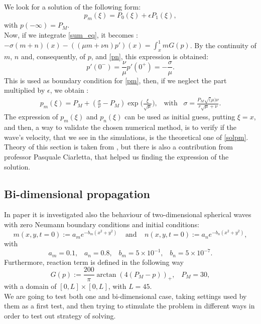 We look for a solution of the following form: 
\begin{equation}
\label{pm}
p_m(\xi) = P_0(\xi) + \epsilon  P_1 (\xi),
\end{equation}
with $ p(-\infty) = P_M $.\\
Now, if we integrate \eqref{sum_eq}, it becomes : $ -\sigma (m + n) (x) - ((\mu m + \nu n) p')(x) = \int^{1}_{x} mG(p)$. By the continuity of $ m $, $ n $ and, consequently, of $ p $, and \eqref{pn}, this expression is obtained:
\begin{equation*}
p'(0^-) = \frac{\nu}{\mu} p'(0^+)=-\frac{\sigma}{\mu}.
\end{equation*} 
This is used as boundary condition for \eqref{pm}, then, if we neglect the part multiplied by $ \epsilon $, we obtain :
\begin{eqnarray}
\label{solpm}
p_m(\xi) = P_M + (\frac{\sigma}{\nu} - P_M) \exp \Big({\frac{\xi}{\sqrt{\mu}}}\Big), \; \; \; \text{with} \; \; \;
\sigma = \frac{P_M \sqrt(\mu) \nu}{r\sqrt{\mu} + \nu}.
\end{eqnarray}
The expression of $ p_m(\xi) $ and $ p_n(\xi) $ can be used as initial guess, putting $ \xi = x $, and then, a way to validate the chosen numerical method, is to verify if the wave's velocity, that we see in the simulations, is the theoretical one of \eqref{solpm}.
Theory of this section is taken from \cite{tumor_growth}, but there is also a contribution from professor Pasquale Ciarletta, that helped us finding the expression of the solution.\\
\subsection{Bi-dimensional propagation}
In paper \cite{tumor_growth} it is investigated also the behaviour of two-dimensional spherical waves with zero Neumann boundary conditions and initial conditions:
\begin{equation*}
m(x,y,t=0) := a_m e^{-b_m (x^2 + y^2)} \; \; \; \; \text{and}\; \; \; \; n(x,y,t=0) := a_n e^{-b_n (x^2 + y^2)} ,
\end{equation*}
with 
\begin{equation*}
a_m = 0.1, \; \; \; a_n =0.8, \; \;\; b_m = 5 \times 10^{-1}, \; \; \; b_n = 5 \times 10^{-7}.
\end{equation*}
Furthermore, reaction term is defined in the following way 
\begin{equation*}
G(p):= \frac{200}{\pi}\arctan(4(P_M-p))_+, \;\;\; P_M = 30,
\end{equation*}
with a domain of  $[0, L] \times [0, L]$, with $ L = 45 $.\\
We are going to test both one and bi-dimensional case, taking settings used by them as a first test, and then trying to stimulate the problem in different ways in order to test out strategy of solving. 